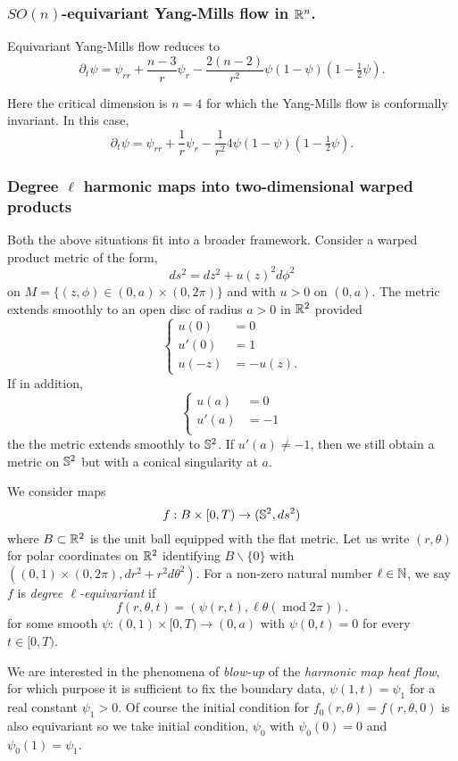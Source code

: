 \documentclass{amsart}
\begin{document}
\subsubsection*{\(SO(n)\)-equivariant Yang-Mills flow in \(\R^n\).}

Equivariant Yang-Mills flow reduces to
\[
\partial_t \psi = \psi_{rr} + \frac{n-3}{r} \psi_r - \frac{2(n-2)}{r^2} \psi(1 - \psi)(1 - \tfrac{1}{2} \psi).
\]

Here the critical dimension is \(n=4\) for which the Yang-Mills flow is conformally invariant. In this case,
\[
\partial_t \psi = \psi_{rr} + \frac{1}{r} \psi_r - \frac{1}{r^2} 4 \psi(1 - \psi)(1 - \tfrac{1}{2} \psi).
\]

\subsubsection*{Degree \(\ell\) harmonic maps into two-dimensional warped products}

Both the above situations fit into a broader framework. Consider a warped product metric of the form,
\[
ds^2 = dz^2 + u(z)^2 d\phi^2
\]
on $M = \{(z,\phi) \in (0, a) \times (0, 2\pi)\}$ and with \(u > 0\) on \((0, a)\). The metric extends smoothly to an open disc of radius $a > 0$ in $\R^2$ provided
\[
\begin{cases}
u(0) &= 0 \\
u'(0) &= 1 \\
u(-z) &= - u(z).
\end{cases}
\]
If in addition,
\[
\begin{cases}
u(a) &= 0 \\
u'(a) &= -1 \\
\end{cases}
\]
the the metric extends smoothly to $\S^2$. If $u'(a) \ne -1$, then we still obtain a metric on $\S^2$ but with a conical singularity at $a$.

We consider maps
\[
f : B \times [0, T) \to (\S^2, ds^2)
\]
where $B \subset \R^2$ is the unit ball equipped with the flat metric. Let us write $(r, \theta)$ for polar coordinates on $\R^2$ identifying $B \backslash \{0\}$ with $((0, 1) \times (0, 2\pi), dr^2 + r^2 d\theta^2)$. For a non-zero natural number \(\ell \in \N\), we say $f$ is \emph{degree $\ell$-equivariant} if
\[
f (r, \theta, t) = (\psi(r, t), \ell\theta (\operatorname{mod} 2\pi)).
\]
for some smooth $\psi : (0, 1) \times [0, T) \to (0, a)$ with \(\psi(0, t) = 0\) for every \(t \in [0, T)\).

We are interested in the phenomena of \emph{blow-up} of the \emph{harmonic map heat flow}, for which purpose it is sufficient to fix the boundary data, \(\psi(1, t) = \psi_1\) for a real constant \(\psi_1 > 0\). Of course the initial condition for \(f_0(r, \theta) = f(r, \theta, 0)\) is also equivariant so we take initial condition, \(\psi_0\) with \(\psi_0(0) = 0\) and \(\psi_0(1) = \psi_1\).
\end{document}

